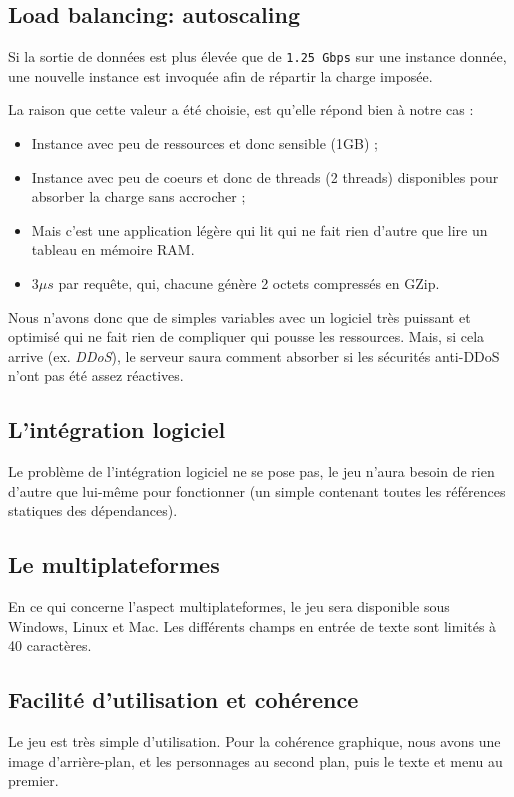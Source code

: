 \documentclass[final]{article}
\newcommand{\code}[1]{
    \boxed{\texttt{#1}}
}
\begin{document}
      \subsection{Load balancing: autoscaling}
        Si la sortie de données est plus élevée que de \texttt{1.25 Gbps} sur une instance donnée,
        une nouvelle instance est invoquée afin de répartir la charge imposée.
        
        La raison que cette valeur a été choisie, est qu'elle répond bien à notre cas :
        \begin{itemize}
          \item Instance avec peu de ressources et donc sensible (1GB) ;
          \item Instance avec peu de coeurs et donc de threads (2 threads) disponibles 
                pour absorber la charge sans accrocher ;
          \item Mais c'est une application légère qui lit qui ne fait rien d'autre que lire 
                un tableau en mémoire RAM.
          \item $ 3\mu s $ par requête, qui, chacune génère 2 octets compressés en GZip.
        \end{itemize}
        
        Nous n'avons donc que de simples variables avec un logiciel très puissant et optimisé
        qui ne fait rien de compliquer qui pousse les ressources. Mais, si cela arrive (ex. \emph{DDoS}),
        le serveur saura comment absorber si les sécurités anti-DDoS n'ont pas été assez réactives.
        
      \subsection{L'intégration logiciel}
        Le problème de l'intégration logiciel ne se pose pas, 
        le jeu n'aura besoin de rien d'autre que lui-même pour fonctionner 
        (un simple \code{.exe} contenant toutes les références statiques des dépendances). 

      \subsection{Le multiplateformes}        
        En ce qui concerne l'aspect multiplateformes, 
        le jeu sera disponible sous Windows, Linux et Mac.
        Les différents champs en entrée de texte sont limités à 40 caractères.
        
      \subsection{Facilité d'utilisation et cohérence}
        Le jeu est très simple d'utilisation. 
        Pour la cohérence graphique, nous avons une image d'arrière-plan, 
        et les personnages au second plan, puis le texte et menu au premier.
        
\end{document}

